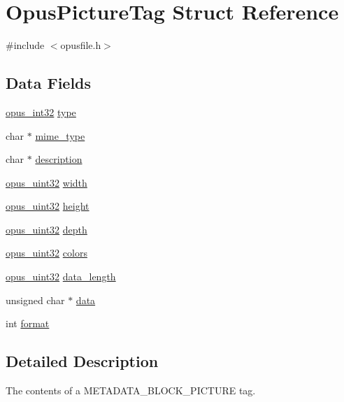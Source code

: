 \hypertarget{struct_opus_picture_tag}{}\section{Opus\+Picture\+Tag Struct Reference}
\label{struct_opus_picture_tag}


{\ttfamily \#include $<$opusfile.\+h$>$}

\subsection*{Data Fields}
\begin{DoxyCompactItemize}
\item 
\hyperlink{opus__types_8h_aa4d309d6f80b99dbabebc8f98879ab9a}{opus\+\_\+int32} \hyperlink{struct_opus_picture_tag_a6e668caeb395b1ec7d438d4a4a9fa845}{type}
\item 
char $\ast$ \hyperlink{struct_opus_picture_tag_ace7f4978d815b186f6aebefed938c9e2}{mime\+\_\+type}
\item 
char $\ast$ \hyperlink{struct_opus_picture_tag_aa32d8bfcd831aa218b0de6d6af92dc08}{description}
\item 
\hyperlink{opus__types_8h_a643eaaadb9ef6cd44308e0299d8cd8ce}{opus\+\_\+uint32} \hyperlink{struct_opus_picture_tag_a805d4de3372bac983cadbd916350ddd6}{width}
\item 
\hyperlink{opus__types_8h_a643eaaadb9ef6cd44308e0299d8cd8ce}{opus\+\_\+uint32} \hyperlink{struct_opus_picture_tag_a2de29a7eef41d13031c70786665eb638}{height}
\item 
\hyperlink{opus__types_8h_a643eaaadb9ef6cd44308e0299d8cd8ce}{opus\+\_\+uint32} \hyperlink{struct_opus_picture_tag_a9af23c314edf9a995c95a4d28f49eac0}{depth}
\item 
\hyperlink{opus__types_8h_a643eaaadb9ef6cd44308e0299d8cd8ce}{opus\+\_\+uint32} \hyperlink{struct_opus_picture_tag_a6fe2f98151fa32a8e2fd13f9309bd1a2}{colors}
\item 
\hyperlink{opus__types_8h_a643eaaadb9ef6cd44308e0299d8cd8ce}{opus\+\_\+uint32} \hyperlink{struct_opus_picture_tag_aaa458d48cd3c9c86b54614389f5b726d}{data\+\_\+length}
\item 
unsigned char $\ast$ \hyperlink{struct_opus_picture_tag_a0514cb1431547c8b3042b9f3bc9b694f}{data}
\item 
int \hyperlink{struct_opus_picture_tag_aba2d71a09ecf0999cf5faf7c2276fb37}{format}
\end{DoxyCompactItemize}


\subsection{Detailed Description}
The contents of a M\+E\+T\+A\+D\+A\+T\+A\+\_\+\+B\+L\+O\+C\+K\+\_\+\+P\+I\+C\+T\+U\+RE tag. 

